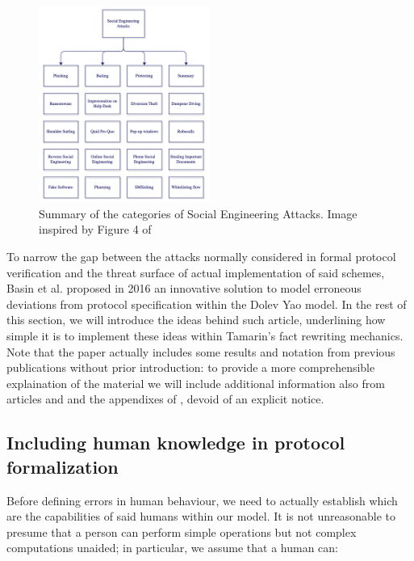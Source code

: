 \documentclass{article}
\begin{document}
\begin{figure}[htbp]
    \centering
    \includegraphics[width=0.5\textwidth]{images/socialengineeringattacks.png}
    \caption{Summary of the categories of Social Engineering Attacks. Image inspired by Figure 4 of \cite{Salahdine_2019}}
    \label{fig:social_engineering_attacks}
  \end{figure}
  
To narrow the gap between the attacks normally considered in formal protocol verification and the threat surface of actual implementation of said schemes, Basin et al. proposed in 2016 \cite{Basin_2016} an innovative solution to model erroneous deviations from protocol specification within the Dolev Yao model. In the rest of this section, we will introduce the ideas behind such article, underlining how simple it is to implement these ideas within Tamarin's fact rewriting mechanics. Note that the paper actually includes some results and notation from previous publications without prior introduction: to provide a more comprehensible explaination of the material we will include additional information also from articles \cite{Lowe_1997} and \cite{Basin_2015} and the appendixes of \cite{Basin_2016}, devoid of an explicit notice.

\subsection{Including human knowledge in protocol formalization}

Before defining errors in human behaviour, we need to actually establish which are the capabilities of said humans within our model. It is not unreasonable to presume that a person can perform simple operations but not complex computations unaided; in particular, we assume that a human can:
\end{document}
